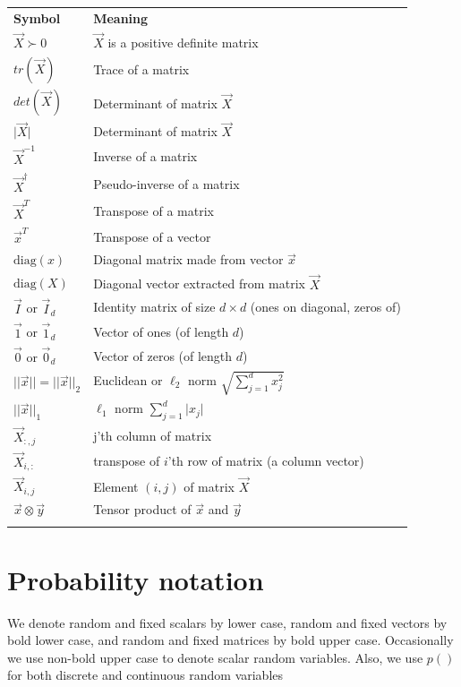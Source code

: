 \documentclass[a4paper,11pt]{article}
\providecommand{\abs}[1]{\lvert#1\rvert}
\begin{document}
\begin{longtable}{ll}
	\hline\noalign{\smallskip}
	\textbf{Symbol} & \textbf{Meaning} \\
	\noalign{\smallskip}\hline\noalign{\smallskip}
	$\vec{X} \succ 0$ & $\vec{X}$ is a positive definite matrix\\
	$tr(\vec{X})$ & Trace of a matrix\\
	$det(\vec{X})$ & Determinant of matrix $\vec{X}$\\
	$\abs{\vec{X}}$ & Determinant of matrix $\vec{X}$\\
	$\vec{X}^{-1}$ & Inverse of a matrix\\
	$\vec{X}^{\dagger}$ & Pseudo-inverse of a matrix\\
	$\vec{X}^T$ & Transpose of a matrix\\
	$\vec{x}^T$ & Transpose of a vector\\
	$\mathrm{diag}(x)$ & Diagonal matrix made from vector $\vec{x}$\\
	$\mathrm{diag}(X)$ & Diagonal vector extracted from matrix $\vec{X}$\\
	$\vec{I}$ or $\vec{I}_d$ & Identity matrix of size $d \times d$ (ones on diagonal, zeros of)\\
	$\vec{1}$ or $\vec{1}_d$ & Vector of ones (of length $d$)\\
	$\vec{0}$ or $\vec{0}_d$ & Vector of zeros (of length $d$)\\
	$\abs{\abs{\vec{x}}}=\abs{\abs{\vec{x}}}_2$ & Euclidean or $\ell_2$ norm $\sqrt{\sum\limits_{j=1}^{d} x_j^2}$\\
	$\abs{\abs{\vec{x}}}_1$ & $\ell_1$ norm $\sum\limits_{j=1}^{d} \abs{x_j}$\\
	$\vec{X}_{:,j}$ & j'th column of matrix\\
	$\vec{X}_{i,:}$ & transpose of $i$'th row of matrix (a column vector)\\
	$\vec{X}_{i,j}$ & Element $(i,j)$ of matrix $\vec{X}$ \\
	$\vec{x} \otimes \vec{y}$ & Tensor product of $\vec{x}$ and $\vec{y}$\\
	\noalign{\smallskip}\hline\noalign{\smallskip}
\end{longtable}


\section*{Probability notation}
We denote random and fixed scalars by lower case, random and fixed vectors by bold lower case, and random and fixed matrices by bold upper case. Occasionally we use non-bold upper case to denote scalar random variables. Also, we use $p()$ for both discrete and continuous random variables
\end{document}
